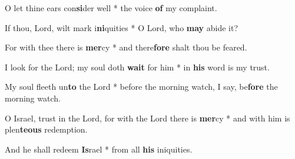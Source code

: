 \begin{multicols}{2}
	O let thine ears con\textbf{si}der well * the voice \textbf{of} my complaint.
	
	If thou, Lord, wilt mark i\textbf{ni}quities * O Lord, who \textbf{may} abide it?
	
	For with thee there is \textbf{mer}cy  * and there\textbf{fore} shalt thou be feared.
	
	I look for the Lord; my soul doth \textbf{wait} for him * in \textbf{his} word is my trust.
	
	My soul fleeth un\textbf{to} the Lord * before the morning watch, I say, be\textbf{fore} the morning watch.
	
	O Israel, trust in the Lord, for with the Lord there is \textbf{mer}cy * and with him is plen\textbf{teous} redemption.
	
	And he shall redeem \textbf{Is}rael * from all \textbf{his} iniquities.
\end{multicols}